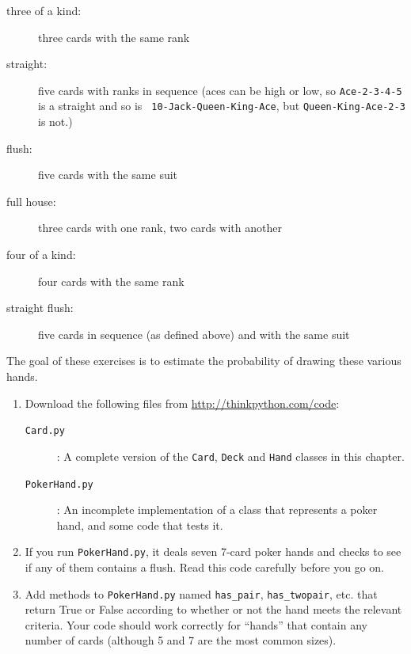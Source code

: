 \documentclass[10pt]{book}
\begin{document}
\begin{CJK}{UTF8}{gbsn}
\begin{exercise}
\begin{description}
\item[three of a kind:] three cards with the same rank
\vspace{-0.05in}

\item[straight:] five cards with ranks in sequence (aces can
be high or low, so {\tt Ace-2-3-4-5} is a straight and so is {\tt
10-Jack-Queen-King-Ace}, but {\tt Queen-King-Ace-2-3} is not.)
\vspace{-0.05in}

\item[flush:] five cards with the same suit
\vspace{-0.05in}

\item[full house:] three cards with one rank, two cards with another
\vspace{-0.05in}

\item[four of a kind:] four cards with the same rank
\vspace{-0.05in}

\item[straight flush:] five cards in sequence (as defined above) and
with the same suit
\vspace{-0.05in}

\end{description}
%
The goal of these exercises is to estimate
the probability of drawing these various hands.

\begin{enumerate}

\item Download the following files from \url{http://thinkpython.com/code}:

\begin{description}

\item[{\tt Card.py}]: A complete version of the {\tt Card},
{\tt Deck} and {\tt Hand} classes in this chapter.

\item[{\tt PokerHand.py}]: An incomplete implementation of a class
that represents a poker hand, and some code that tests it.

\end{description}
%
\item If you run {\tt PokerHand.py}, it deals seven 7-card poker hands
and checks to see if any of them contains a flush.  Read this
code carefully before you go on.

\item Add methods to {\tt PokerHand.py} named \verb"has_pair",
\verb"has_twopair", etc. that return True or False according to
whether or not the hand meets the relevant criteria.  Your code should
work correctly for ``hands'' that contain any number of cards
(although 5 and 7 are the most common sizes).


\end{enumerate}
\end{exercise}
\end{CJK}
\end{document}
